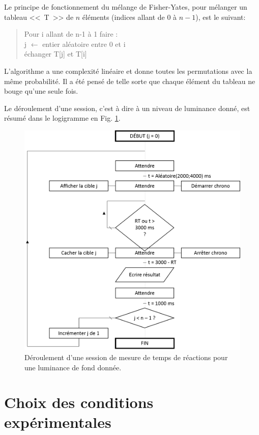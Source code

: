 	\par Le principe de fonctionnement du mélange de Fisher-Yates, pour mélanger un tableau <<~T~>> de $n$ éléments (indices allant de $0$ à $n-1$), est le suivant:
	\begin{quote}
	 Pour i allant de n-1 à 1 faire :\\
       j $\leftarrow$ entier aléatoire entre 0 et i\\
       échanger T[j] et T[i]
	\end{quote}
	L'algorithme a une complexité linéaire et donne toutes les permutations avec la même probabilité. Il a été pensé de telle sorte que chaque élément du tableau ne bouge qu'une seule fois.
	
	\par Le déroulement d'une session, c'est à dire à un niveau de luminance donné, est résumé dans le logigramme en Fig. \ref{fig:flowchart_expe}.
	
	\begin{figure}[h][h]
		\centering
		\includegraphics[scale=0.8]{Figures/FlowchartExpeRVP}
		\caption{Déroulement d'une session de mesure de temps de réactions pour une luminance de fond donnée.}
		\label{fig:flowchart_expe}
	\end{figure}
	
	\section{Choix des conditions expérimentales}

